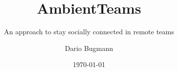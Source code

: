 \documentclass{seal_thesis}
\date{\today}
\title{AmbientTeams}
\subtitle{An approach to stay socially connected in remote teams}
\author{Dario Bugmann}
\begin{document}
\maketitle

\frontmatter

\begin{acknowledgements}

\end{acknowledgements}

\begin{abstract}
\end{abstract}

\begin{zusammenfassung}
\end{zusammenfassung}

\tableofcontents
\listoffigures
\listoftables
\lstlistoflistings

\mainmatter






\begin{appendices}
    
    
\end{appendices}


\backmatter
\printbibliography
\end{document}
